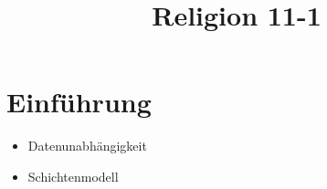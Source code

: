 \documentclass[11pt, paper=a4, twocolumn]{scrartcl}
\title{\vspace{-1.25cm}Religion 11-1\vspace{-0.25cm}}
\date{\vspace{-5ex}}
\begin{document}
	\maketitle


	\section{Einführung}
		\begin{itemize}
			\item Datenunabhängigkeit
			\item Schichtenmodell
		\end{itemize}
\end{document}
